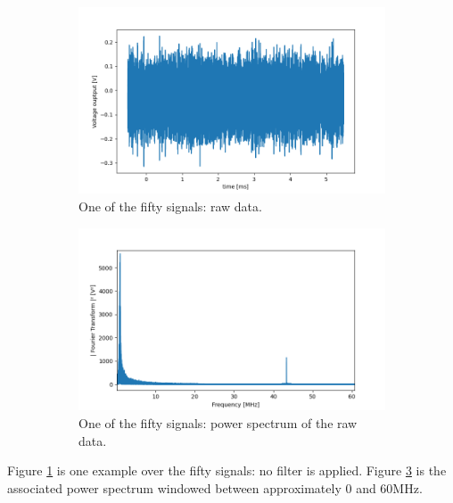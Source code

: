 \documentclass[11pt]{report}
\begin{document}
\begin{figure}[h!]
\centering
\begin{subfigure}{.48\textwidth}
  \centering
  \includegraphics[width=1.1\linewidth]{sp-f-rough}
  \caption{One of the fifty signals: raw data.}
  \label{fig:sp-f-rough}
\end{subfigure}%
\hspace{1em}%
\begin{subfigure}{.48\textwidth}
  \centering
  \includegraphics[width=1.1\linewidth]{sp-fft-rough}
  \caption{One of the fifty signals: power spectrum of the raw data.}
  \label{fig:sp-fft-rough}
\end{subfigure}
\caption{}
\end{figure}

Figure \ref{fig:sp-f-rough} is one example over the fifty signals: no filter is applied. Figure \ref{fig:sp-fft-rough} is the associated power spectrum windowed between approximately 0 and 60MHz.
\end{document}
